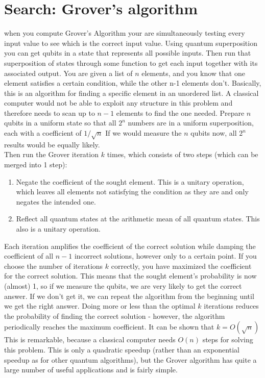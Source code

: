 \section{Search: Grover's algorithm}
when you compute Grover's Algorithm your are simultaneously testing every input value to see which is the correct input value. Using quantum superposition you can get qubits in a state that represents all possible inputs. Then run that superposition of states through some function to get each input together with its associated output. You are given a list of $n$ elements, and you know that one element satisfies a certain condition, while the other n-1 elements don't. Basically, this is an algorithm for finding a specific element in an unordered list. A classical computer would not be able to exploit any structure in this problem and therefore needs to scan up to $n-1$ elements to find the one needed.
Prepare $n$ qubits in a uniform state so that all $2^n$ numbers are in a uniform superposition, each with a coefficient of $1/\sqrt{n}$ If we would measure the $n$ qubits now, all $2^n$ results would be equally likely.\\
Then run the Grover iteration $k$ times, which consists of two steps (which can be merged into 1 step):
\begin{enumerate}
\item Negate the coefficient of the sought element. This is a unitary operation, which leaves all elements not satisfying the condition as they are and only negates the intended one.
\item Reflect all quantum states at the arithmetic mean of all quantum states. This also is a unitary operation.
\end{enumerate}
Each iteration amplifies the coefficient of the correct solution while damping the coefficient of all $n-1$ incorrect solutions, however only to a certain point.
If you choose the number of iterations $k$ correctly, you have maximized the coefficient for the correct solution. This means that the sought element's probability is now (almost) 1, so if we measure the qubits, we are very likely to get the correct answer. If we don't get it, we can repeat the algorithm from the beginning until we get the right answer. Doing more or less than the optimal $k$ iterations reduces the probability of finding the correct solution - however, the algorithm periodically reaches the maximum coefficient.
It can be shown that $k=O(\sqrt{n})$ This is remarkable, because a classical computer needs $O(n)$ steps for solving this problem. This is only a quadratic speedup (rather than an exponential speedup as for other quantum algorithms), but the Grover algorithm has quite a large number of useful applications and is fairly simple.
